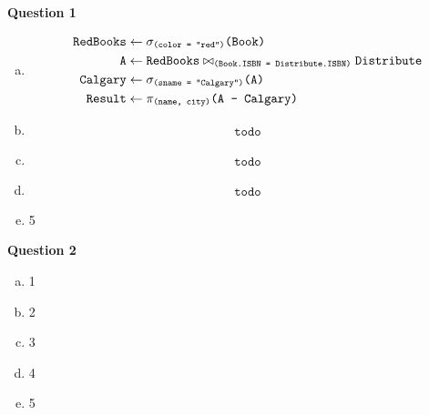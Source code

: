 \documentclass[11pt]{article}
\def\code#1{\texttt{#1}}
\def\select#1#2{\sigma_{\code{#1}} \code{(#2)}}
\def\join#1#2#3{\code{#1} \bowtie_{\code{#2}} \code{#3}}
\def\proj#1#2{\pi_{\code{#1}} \code{(#2)}}
\def\diff#1#2{\code{#1} - \code{#2}}
\begin{document}
\item[] \textbf{Question 1}

  \begin{enumerate}[a.]
    \item
      \begin{equation*}
      \begin{aligned}
        \code{RedBooks} &\leftarrow \select{(color = "red")}{Book} \\
        \code{A} &\leftarrow \join{RedBooks}{(Book.ISBN = Distribute.ISBN)}{Distribute} \\
        \code{Calgary} &\leftarrow \select{(sname = "Calgary")}{A} \\
        \code{Result} &\leftarrow \proj{(name, city)} {\diff{A}{Calgary}}
      \end{aligned}
      \end{equation*}

    \item
      \begin{equation*}
      \begin{aligned}
				\code{todo}
      \end{aligned}
      \end{equation*}

    \item 
      \begin{equation*}
      \begin{aligned}
				\code{todo}
      \end{aligned}
      \end{equation*}

    \item
      \begin{equation*}
      \begin{aligned}
				\code{todo}
      \end{aligned}
      \end{equation*}

    \item 5
  \end{enumerate}


\item[] \textbf{Question 2}

  \begin{enumerate}[a.]

    \item 1
    \item 2
    \item 3
    \item 4
    \item 5

  \end{enumerate}
\end{document}
